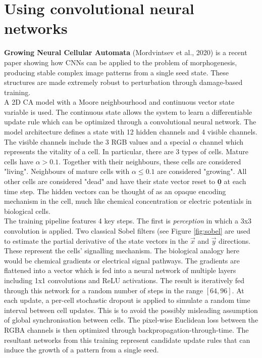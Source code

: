 \section{Using convolutional neural networks}

\noindent
\textbf{Growing Neural Cellular Automata} (Mordvintsev et al., 2020) \cite{mordvintsev2020growing} is a recent paper showing how CNNs can be applied to the problem of morphogenesis, producing stable complex image patterns from a single seed state. These structures are made extremely robust to perturbation through damage-based training. \\

A 2D CA model with a Moore neighbourhood and continuous vector state variable is used.
The continuous state allows the system to learn a differentiable update rule which can be optimized through a convolutional neural network.
The model architecture defines a state with 12 hidden channels and 4 visible channels.
The visible channels include the 3 RGB values and a special $\alpha$ channel which represents the vitality of a cell.
In particular, there are 3 types of cells.
Mature cells have $\alpha > 0.1$.
Together with their neighbours, these cells are considered "living".
Neighbours of mature cells with $\alpha \leq 0.1$ are considered "growing".
All other cells are considered "dead" and have their state vector reset to $\underline{\mathbf{0}}$ at each time step.
The hidden vectors can be thought of as an opaque encoding mechanism in the cell, much like chemical concentration or electric potentials in biological cells.\\

The training pipeline features 4 key steps.
The first is \textit{perception} in which a 3x3 convolution is applied.
Two classical Sobel filters (see Figure \ref{fig:sobel} are used to estimate the partial derivative of the state vectors in the $\overrightarrow{x}$ and $\overrightarrow{y}$ directions.
These represent the cells' signalling mechanism.
The biological analogy here would be chemical gradients or electrical signal pathways.
The gradients are flattened into a vector which is fed into a neural network of multiple layers including 1x1 convolutions and ReLU activations.
The result is iteratively fed through this network for a random number of steps in the range $[64, 96]$.
At each update, a per-cell stochastic dropout is applied to simulate a random time interval between cell updates.
This is to avoid the possibly misleading assumption of global synchronisation between cells.
The pixel-wise Euclidean loss between the RGBA channels is then optimized through backpropagation-through-time. The resultant networks from this training represent candidate update rules that can induce the growth of a pattern from a single seed.\\

